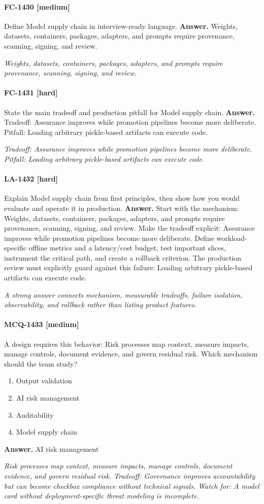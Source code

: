 \paragraph{FC-1430 [medium]} Define Model supply chain in interview-ready language.
\noindent\textbf{Answer.} Weights, datasets, containers, packages, adapters, and prompts require provenance, scanning, signing, and review.
\par\textit{Weights, datasets, containers, packages, adapters, and prompts require provenance, scanning, signing, and review.}
\paragraph{FC-1431 [hard]} State the main tradeoff and production pitfall for Model supply chain.
\noindent\textbf{Answer.} Tradeoff: Assurance improves while promotion pipelines become more deliberate. Pitfall: Loading arbitrary pickle-based artifacts can execute code.
\par\textit{Tradeoff: Assurance improves while promotion pipelines become more deliberate. Pitfall: Loading arbitrary pickle-based artifacts can execute code.}
\paragraph{LA-1432 [hard]} Explain Model supply chain from first principles, then show how you would evaluate and operate it in production.
\noindent\textbf{Answer.} Start with the mechanism: Weights, datasets, containers, packages, adapters, and prompts require provenance, scanning, signing, and review. Make the tradeoff explicit: Assurance improves while promotion pipelines become more deliberate. Define workload-specific offline metrics and a latency/cost budget, test important slices, instrument the critical path, and create a rollback criterion. The production review must explicitly guard against this failure: Loading arbitrary pickle-based artifacts can execute code.
\par\textit{A strong answer connects mechanism, measurable tradeoffs, failure isolation, observability, and rollback rather than listing product features.}
\paragraph{MCQ-1433 [medium]} A design requires this behavior: Risk processes map context, measure impacts, manage controls, document evidence, and govern residual risk. Which mechanism should the team study?
\begin{enumerate}[label=\Alph*.]
\item Output validation
\item AI risk management
\item Auditability
\item Model supply chain
\end{enumerate}
\noindent\textbf{Answer.} AI risk management
\par\textit{Risk processes map context, measure impacts, manage controls, document evidence, and govern residual risk. Tradeoff: Governance improves accountability but can become checkbox compliance without technical signals. Watch for: A model card without deployment-specific threat modeling is incomplete.}
